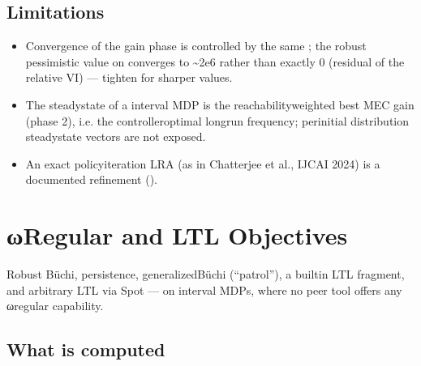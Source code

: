 \documentclass[a4paper,10pt,english]{sphinxmanual}
\begin{document}
\subsection{Limitations}
\label{\detokenize{manual/lra-steadystate:limitations}}\begin{itemize}
\item {} 
\sphinxAtStartPar
Convergence of the gain phase is controlled by the same ; the robust
pessimistic value on  converges to \textasciitilde{}2e\sphinxhyphen{}6 rather than exactly 0
(residual of the relative VI) — tighten  for sharper values.

\item {} 
\sphinxAtStartPar
The steady\sphinxhyphen{}state of a  interval MDP is the reachability\sphinxhyphen{}weighted best
MEC gain (phase 2), i.e. the controller\sphinxhyphen{}optimal long\sphinxhyphen{}run frequency; per\sphinxhyphen{}initial
distribution steady\sphinxhyphen{}state vectors are not exposed.

\item {} 
\sphinxAtStartPar
An exact policy\sphinxhyphen{}iteration LRA (as in Chatterjee et al., IJCAI 2024) is a documented
refinement ().

\end{itemize}

\sphinxstepscope


\section{ω\sphinxhyphen{}Regular and LTL Objectives}
\label{\detokenize{manual/omega-ltl:regular-and-ltl-objectives}}\label{\detokenize{manual/omega-ltl::doc}}
\sphinxAtStartPar
Robust Büchi, persistence, generalized\sphinxhyphen{}Büchi (“patrol”), a built\sphinxhyphen{}in LTL fragment, and
arbitrary LTL via Spot — on interval MDPs, where no peer tool offers any ω\sphinxhyphen{}regular
capability.


\subsection{What is computed}
\label{\detokenize{manual/omega-ltl:what-is-computed}}
\end{document}
